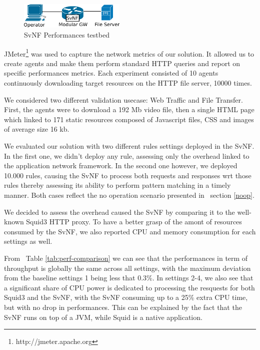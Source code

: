 \begin{figure}
  \begin{center}
    \includegraphics[width=0.45\textwidth,natwidth=6000,natheight=4000]{fig/testbed.pdf}
  \end{center}
  \caption{ SvNF Performances testbed
    \label{fig:testbed}
  }
\end{figure}	

JMeter\footnote{http://jmeter.apache.org} was used to capture the network metrics of our solution.
It allowed us to create agents and make them perform standard HTTP queries and report on specific performances metrics. Each experiment consisted of 10 agents continuously downloading target resources on the HTTP file server, 10000 times.

We considered two different validation usecase: Web Traffic and File Transfer. First, the agents were to download a 192 Mb video file, then a single HTML page which linked to 171 static resources composed of Javascript files, CSS and images of average size 16 kb.

We evaluated our solution with two different rules settings deployed in the SvNF. In the first one, we didn't deploy any rule, assessing only the overhead linked to the application network framework. In the second one however, we deployed 10.000 rules, causing the SvNF to process both requests and responses wrt those rules thereby assessing its ability to perform pattern matching in a timely manner. Both cases reflect the no operation scenario presented in ~section \ref{noop}.

We decided to assess the overhead caused the SvNF by comparing it to the well-known Squid3 HTTP proxy. To have a better grasp of the amont of resources consumed by the SvNF, we also reported CPU and memory consumption for each settings as well.

From ~Table \ref{tab:perf-comparison} we can see that the performances in term of throughput is globally the same across all settings, with the maximum deviation from the baseline settings 1 being less that 0.3\%.
In settings 2-4, we also see that a significant share of CPU power is dedicated to processing the resquests for both Squid3 and the SvNF, with the SvNF consuming up to a 25\% extra CPU time, but with no drop in performances. This can be explained by the fact that the SvNF runs on top of a JVM, while Squid is a native application.

